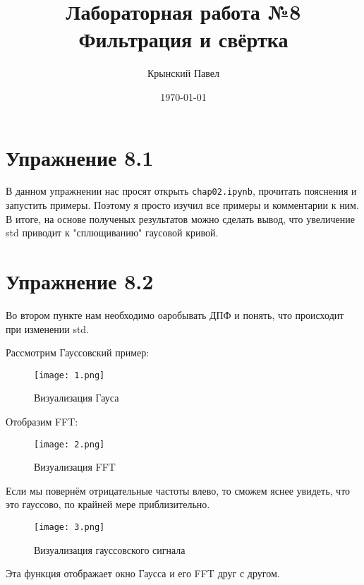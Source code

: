\documentclass[a4paper,12pt]{report}
\title{Лабораторная работа №8\\Фильтрация и свёртка}
\author{Крынский Павел}
\date{\today}
\begin{document}
\maketitle
\tableofcontents
\listoffigures
\lstlistoflistings

\maketitle

\chapter{Упражнение 8.1}

В данном упражнении нас просят открыть \texttt{chap02.ipynb}, прочитать пояснения и запустить примеры. Поэтому я просто изучил все примеры и комментарии к ним.
В итоге, на основе полученых результатов можно сделать вывод, что увеличение std приводит к "сплющиванию" гаусовой кривой.

\chapter{Упражнение 8.2}

Во втором пункте нам необходимо оаробывать ДПФ и понять, что происходит при изменении std.

Рассмотрим Гауссовский пример:

\begin{figure}[H]
        \centering
        \texttt{[image: 1.png]}
        \caption{Визуализация Гауса}
        \label{fig:lab8_fig2_1}
\end{figure}

Отобразим FFT:

\begin{figure}[H]
        \centering
        \texttt{[image: 2.png]}
        \caption{Визуализация FFT}
        \label{fig:lab8_fig2_2}
\end{figure}

Если мы повернём отрицательные частоты влево, то сможем яснее увидеть, что это гауссово, по крайней мере приблизительно.

\begin{figure}[H]
        \centering
        \texttt{[image: 3.png]}
        \caption{Визуализация гауссовского сигнала}
        \label{fig:lab8_fig2_3}
\end{figure}

Эта функция отображает окно Гаусса и его FFT друг с другом.
\end{document}
